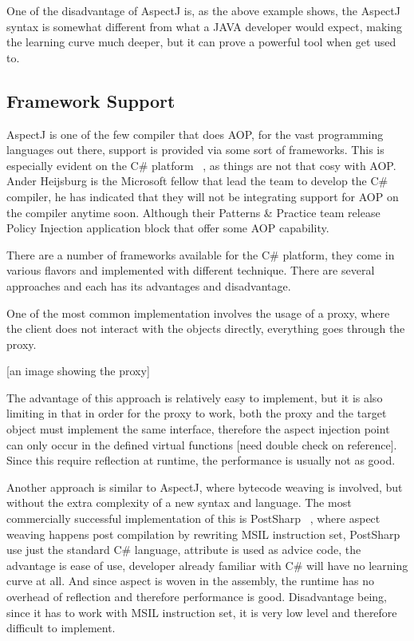 One of the disadvantage of AspectJ is, as the above example shows, the AspectJ syntax is somewhat different from what a JAVA developer would expect, making the learning curve much deeper, but it can prove a powerful tool when get used to.

\subsection{Framework Support}

AspectJ is one of the few compiler that does AOP, for the vast programming languages out there, support is provided via some sort of frameworks. This is especially evident on the C\# platform ~\cite{aopcs}, as things are not that cosy with AOP. Ander Heijsburg is the Microsoft fellow that lead the team to develop the C\# compiler, he has indicated that they will not be integrating support for AOP on the compiler anytime soon. Although their Patterns \& Practice team release Policy Injection application block that offer some AOP capability.

There are a number of frameworks available for the C\# platform, they come in various flavors and implemented with different technique. There are several approaches and each has its advantages and disadvantage.

One of the most common implementation involves the usage of a proxy, where the client does not interact with the objects directly, everything goes through the proxy.

[an image showing the proxy]

The advantage of this approach is relatively easy to implement, but it is also limiting in that in order for the proxy to work, both the proxy and the target object must implement the same interface, therefore the aspect injection point can only occur in the defined virtual functions [need double check on reference]. Since this require reflection at runtime, the performance is usually not as good.

Another approach is similar to AspectJ, where bytecode weaving is involved, but without the extra complexity of a new syntax and language. The most commercially successful implementation of this is PostSharp ~\cite{postsharp}, where aspect weaving happens post compilation by rewriting MSIL instruction set, PostSharp use just the standard C\# language, attribute is used as advice code, the advantage is ease of use, developer already familiar with C\# will have no learning curve at all. And since aspect is woven in the assembly, the runtime has no overhead of reflection and therefore performance is good. Disadvantage being, since it has to work with MSIL instruction set, it is very low level and therefore difficult to implement.

